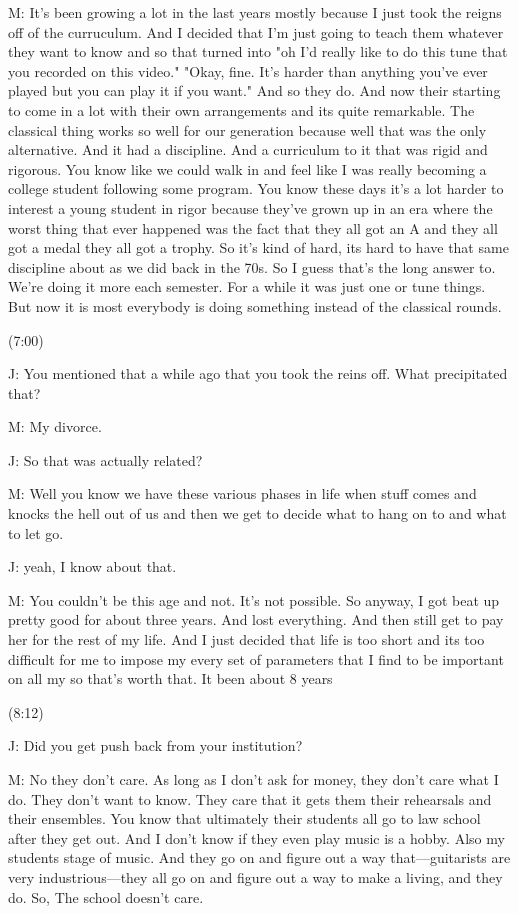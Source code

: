 \documentclass[11pt]{article}
\begin{document}
M: It's been growing a lot in the last years mostly because I just took the reigns off of the curruculum. And I decided that I'm just going to teach them whatever they want to know and so that turned into "oh I'd really like to do this tune that you recorded on this video." "Okay, fine. It's harder than anything you've ever played but you can play it if you want." And so they do. And now their starting to come in a lot with their own arrangements and its quite remarkable. The classical thing works so well for our generation because well that was the only alternative. And it had a discipline. And a curriculum to it that was rigid and rigorous. You know like we could walk in and feel like I was really becoming a college student following some program. You know these days it's a lot harder to interest a young student in rigor because they've grown up in an era where the worst thing that ever happened was the fact that they all got an A and they all got a medal they all got a trophy. So it's kind of hard, its hard to have that same discipline about as we did back in the 70s. So I guess that's the long answer to. We're doing it more each semester. For a while it was just one or tune things. But now it is most everybody is doing something instead of the classical rounds. 

(7:00)

J: You mentioned that a while ago that you took the reins off. What precipitated that?

M: My divorce.

J: So that was actually related?

M: Well you know we have these various phases in life when stuff comes and knocks the hell out of us and then we get to decide what to hang on to and what to let go.

J: yeah, I know about that.

M: You couldn't be this age and not. It's not possible. So anyway, I got beat up pretty good for about three years. And lost everything. And then still get to pay her for the rest of my life. And I just decided that life is too short and its too difficult for me to impose my every set of parameters that I find to be important on all my so that's worth that. It been about 8 years

(8:12)

J: Did you get push back from your institution?

M: No they don't care. As long as I don't ask for money, they don't care what I do. They don't want to know. They care that it gets them their rehearsals and their ensembles. You know that ultimately their students all go to law school after they get out. And I don't know if they even play music is a hobby. Also my students stage of music. And they go on and figure out a way that---guitarists are very industrious---they all go on and figure out a way to make a living, and they do. So, The school doesn't care.
\end{document}
